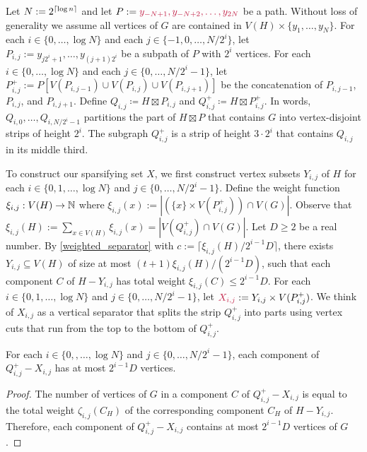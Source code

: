 \documentclass{patmorin}
\makeatletter
\renewcommand{\ge}{\geqslant}
\renewcommand{\le}{\leqslant}
\def\mathcolor#1#{\@mathcolor{#1}}
\def\@mathcolor#1#2#3{%
  \protect\leavevmode
  \begingroup
    \color#1{#2}#3%
  \endgroup
}
\newcommand{\mathdefin}[1]{\mathcolor{brightmaroon}{#1}}
\makeatother
\begin{document}
Let $N:=2^{{\lceil \log n \rceil}}$ and let $P:=\mathdefin{y_{-N+1},y_{-N+2},\ldots,y_{2N}}$ be a path.  Without loss of generality we assume all vertices of $G$ are contained in $V(H)\times\{y_1,\ldots,y_N\}$.  For each $i\in\{0,\ldots,\log N\}$ and each $j\in\{-1,0,\ldots,N/2^{i}\}$, let $P_{i,j}:=y_{j2^i+1},\ldots,y_{(j+1)2^i}$ be a subpath of $P$ with $2^i$ vertices. For each $i\in\{0,\ldots,\log N\}$ and each $j\in\{0,\ldots,N/2^{i}-1\}$, let $P^+_{i,j}:=P[V(P_{i,j-1})\cup V(P_{i,j})\cup V(P_{i,j+1})]$ be the concatenation of $P_{i,j-1}$, $P_{i,j}$, and $P_{i,j+1}$. Define $Q_{i,j}\coloneqq H\boxtimes P_{i,j}$ and $Q^+_{i,j}\coloneqq H\boxtimes P^+_{i,j}$.
In words, $Q_{i,0},\ldots,Q_{i,N/2^i-1}$ partitions the part of $H\boxtimes P$ that contains $G$ into vertex-disjoint strips of height $2^i$. The subgraph $Q^+_{i,j}$ is a strip of height $3\cdot 2^i$ that contains $Q_{i,j}$ in its middle third.

To construct our sparsifying set $X$, we first construct vertex subsets $Y_{i,j}$ of $H$ for each $i\in\{0,1,\ldots,\log N\}$ and $j\in\{0,\ldots,N/2^{i}-1\}$.  Define the weight function $\xi_{i,j}:V(H)\to\mathbb{N}$ where $\xi_{i,j}(x):=|(\{x\}\times V(P^+_{i,j})) \cap V(G)|$.  Observe that $\xi_{i,j}(H):=\sum_{x\in V(H)} \xi_{i,j}(x)=|V(Q^+_{i,j})\cap V(G)|$. Let $D\ge 2$ be a real number.  By \cref{weighted_separator} with $c:=\lceil\xi_{i,j}(H)/2^{i-1}D\rceil$, there exists $Y_{i,j}\subseteq V(H)$ of size at most $(t+1)\xi_{i,j}(H)/(2^{i-1}D)$, such that each component $C$ of $H-Y_{i,j}$ has total weight $\xi_{i,j}(C)\le 2^{i-1}D$.  For each $i\in\{0,1,\ldots,\log N\}$ and $j\in\{0,\ldots,N/2^{i}-1\}$, let $\mathdefin{X_{i,j}}:=Y_{i,j}\times V(P^+_{i,j})$.  We think of $X_{i,j}$ as a vertical separator that splits the strip $Q^+_{i,j}$ into parts using vertex cuts that run from the top to the bottom of $Q^+_{i,j}$.

\begin{lem}\label{component_sizes}
  For each $i\in\{0,,\ldots,\log N\}$ and $j\in\{0,\ldots,N/2^{i}-1\}$, each component of $Q^+_{i,j}-X_{i,j}$ has at most $2^{i-1}D$ vertices.\
\end{lem}

\begin{proof}
  The number of vertices of $G$ in a component $C$ of $Q^+_{i,j}-X_{i,j}$ is equal to the total weight $\zeta_{i,j}(C_H)$ of the corresponding component $C_H$ of $H-Y_{i,j}$.  Therefore, each component of $Q^+_{i,j}-X_{i,j}$ contains at most $2^{i-1}D$ vertices of $G$.
\end{proof}
\end{document}
